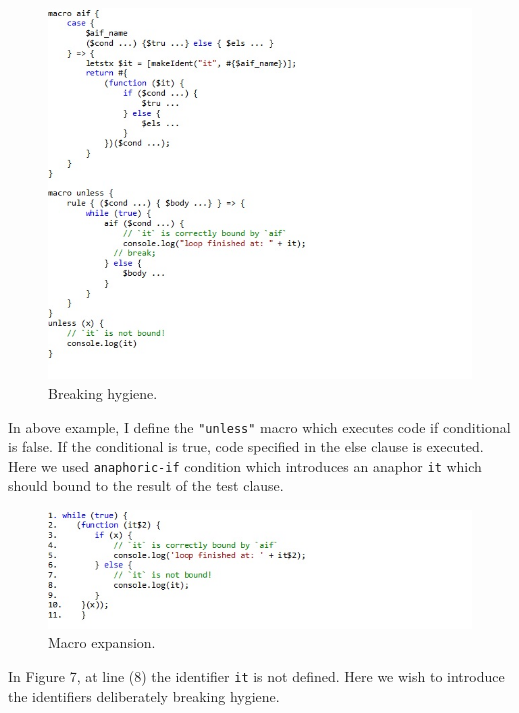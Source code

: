 \newpage
\begin{figure}
\centering
\includegraphics[width=1.0\textwidth]{images/Breakhygiene.jpg}
\caption{Breaking hygiene.} 
\label{fig:Breakhygiene}

\end{figure}
In above example, I define the \texttt{"unless"} macro which executes code if conditional is false. If the conditional is true, code specified in the else clause is executed. Here we used \texttt{anaphoric-if} condition which introduces an anaphor \texttt{it} which should bound to the result of the test clause.

\newpage
\begin{figure}

\centering
\includegraphics[width=1.0\textwidth]{images/macroexpansion.jpg}
\caption{Macro expansion.} 
\label{fig:macroexpansion}

\end{figure}

\newpage

In Figure 7, at line (8) the identifier \texttt{it} is not defined. Here we wish to introduce the identifiers deliberately breaking hygiene. 

